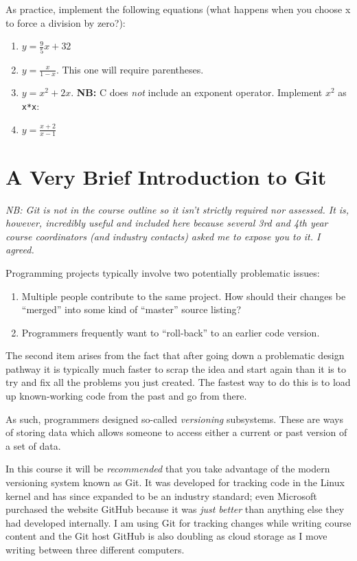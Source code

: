 \documentclass{lab}
\begin{document}
As practice, implement the following equations (what happens when you choose x to force a division by zero?):


\begin{enumerate}
\item $y = \frac{9}{5} x + 32$
\item $y = \frac{x}{1 - x}$.  This one will require parentheses.
\item $y = x^2 + 2x$. \textbf{NB:} C does \textit{not} include an exponent operator. Implement $x^2$ as \texttt{x*x}:
\item $y = \frac{x + 2}{x - 1}$
\end{enumerate}

\pagebreak
\section{A Very Brief Introduction to Git}

\textit{NB: Git is not in the course outline so it isn't strictly required nor assessed. It is, however, incredibly useful and included here because several 3rd and 4th year course coordinators (and industry contacts) asked me to expose you to it. I agreed.}

Programming projects typically involve two potentially problematic issues:

\begin{enumerate}
	\item Multiple people contribute to the same project. How should their changes be ``merged'' into some kind of ``master'' source listing?
	\item Programmers frequently want to ``roll-back'' to an earlier code version.
\end{enumerate}

The second item arises from the fact that after going down a problematic design pathway it is typically much faster to scrap the idea and start again than it is to try and fix all the problems you just created. The fastest way to do this is to load up known-working code from the past and go from there.

As such, programmers designed so-called \textit{versioning} subsystems. These are ways of storing data which allows someone to access either a current or past version of a set of data.

In this course it will be \textit{recommended} that you take advantage of the modern versioning system known as Git. It was developed for tracking code in the Linux kernel and has since expanded to be an industry standard; even Microsoft purchased the website GitHub because it was \textit{just better} than anything else they had developed internally. I am using Git for tracking changes while writing course content and the Git host GitHub is also doubling as cloud storage as I move writing between three different computers.
\end{document}
